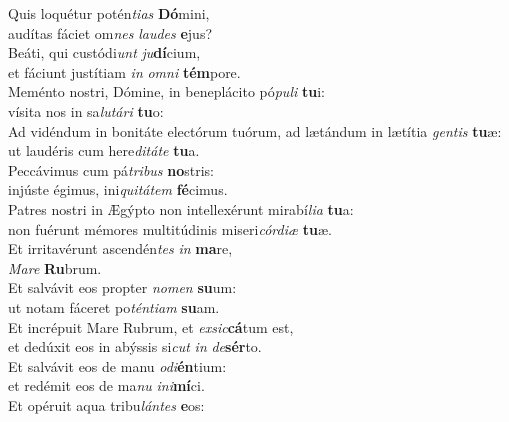 \evenverse Quis loquétur potén\textit{ti}\textit{as} \textbf{Dó}mini,~\*\\
\evenverse audítas fáciet om\textit{nes} \textit{lau}\textit{des} \textbf{e}jus?\\
\oddverse Beáti, qui custódi\textit{unt} \textit{ju}\textbf{dí}cium,~\*\\
\oddverse et fáciunt justítiam \textit{in} \textit{om}\textit{ni} \textbf{tém}pore.\\
\evenverse Meménto nostri, Dómine, in beneplácito pó\textit{pu}\textit{li} \textbf{tu}i:~\*\\
\evenverse vísita nos in sa\textit{lu}\textit{tá}\textit{ri} \textbf{tu}o:\\
\oddverse Ad vidéndum in bonitáte electórum tuórum, ad lætándum in lætítia \textit{gen}\textit{tis} \textbf{tu}æ:~\*\\
\oddverse ut laudéris cum here\textit{di}\textit{tá}\textit{te} \textbf{tu}a.\\
\evenverse Peccávimus cum pá\textit{tri}\textit{bus} \textbf{no}stris:~\*\\
\evenverse injúste égimus, ini\textit{qui}\textit{tá}\textit{tem} \textbf{fé}cimus.\\
\oddverse Patres nostri in Ægýpto non intellexérunt mirabí\textit{li}\textit{a} \textbf{tu}a:~\*\\
\oddverse non fuérunt mémores multitúdinis miseri\textit{cór}\textit{di}\textit{æ} \textbf{tu}æ.\\
\evenverse Et irritavérunt ascendén\textit{tes} \textit{in} \textbf{ma}re,~\*\\
\evenverse \textit{Ma}\textit{re} \textbf{Ru}brum.\\
\oddverse Et salvávit eos propter \textit{no}\textit{men} \textbf{su}um:~\*\\
\oddverse ut notam fáceret po\textit{tén}\textit{ti}\textit{am} \textbf{su}am.\\
\evenverse Et incrépuit Mare Rubrum, et \textit{ex}\textit{sic}\textbf{cá}tum est,~\*\\
\evenverse et dedúxit eos in abýssis si\textit{cut} \textit{in} \textit{de}\textbf{sér}to.\\
\oddverse Et salvávit eos de manu \textit{o}\textit{di}\textbf{én}tium:~\*\\
\oddverse et redémit eos de ma\textit{nu} \textit{i}\textit{ni}\textbf{mí}ci.\\
\evenverse Et opéruit aqua tribu\textit{lán}\textit{tes} \textbf{e}os:~\*\\
